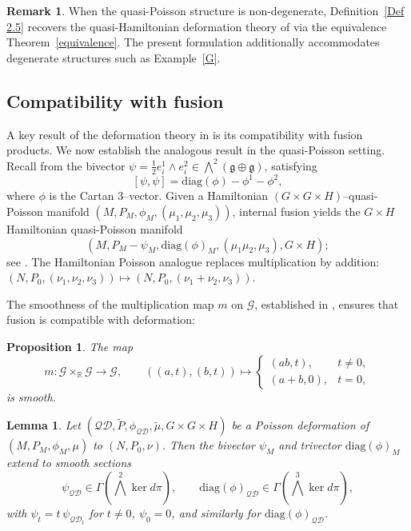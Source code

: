 \documentclass[reqno]{amsart}
\theoremstyle{plain}
\newtheorem{Prop}[Thm]{Proposition}
\newtheorem{Lem}[Thm]{Lemma}
\theoremstyle{definition}
\newtheorem{Rem}[Thm]{Remark}
\begin{document}
\begin{Rem}
When the quasi-Poisson structure is non-degenerate, Definition~\ref{Def 2.5} recovers the quasi-Hamiltonian deformation theory of \cite{JMM2025deformations} via the equivalence Theorem~\ref{equivalence}. The present formulation additionally accommodates degenerate structures such as Example~\ref{G}.
\end{Rem}

\subsection{Compatibility with fusion}\label{sec 3}

A key result of the deformation theory in \cite{JMM2025deformations} is its compatibility with fusion products. We now establish the analogous result in the quasi-Poisson setting. Recall from \cite[]{alekseev2002quasi} the bivector $\psi=\tfrac{1}{2}e^{1}_{i}\wedge e^{2}_{i}\in\bigwedge^{2}(\mathfrak{g}\oplus\mathfrak{g})$, satisfying
\[
[\psi,\psi]=\mathrm{diag}(\phi)-\phi^{1}-\phi^{2},
\]
where $\phi$ is the Cartan 3--vector. Given a Hamiltonian $(G\times G\times H)$--quasi-Poisson manifold $(M,P_{M},\phi_{M},(\mu_{1},\mu_{2},\mu_{3}))$, internal fusion yields the $G\times H$ Hamiltonian quasi-Poisson manifold
\[
(M,P_{M}-\psi_{M},\mathrm{diag}(\phi)_{M},(\mu_{1}\mu_{2},\mu_{3}),G\times H);
\]
see \cite[]{alekseev2002quasi}. The Hamiltonian Poisson analogue replaces multiplication by addition: $(N,P_{0},(\nu_{1},\nu_{2},\nu_{3}))\mapsto (N,P_{0},(\nu_{1}+\nu_{2},\nu_{3}))$.

The smoothness of the multiplication map $m$ on $\mathcal{G}$, established in \cite[]{JMM2025deformations}, ensures that fusion is compatible with deformation:

\begin{Prop}\cite[]{JMM2025deformations}\label{prop:mult-smooth}
The map
\[
m:\mathcal{G}\times_{\mathbb{R}}\mathcal{G}\to\mathcal{G},\qquad
((a,t),(b,t))\mapsto
\begin{cases}
(ab,t), & t\neq 0,\\[4pt]
(a+b,0), & t=0,
\end{cases}
\]
is smooth.
\end{Prop}

\begin{Lem}\label{lem 3.2}
Let $(\mathcal{QD},\tilde{P},\phi_{\mathcal{QD}},\tilde{\mu},G\times G\times H)$ be a Poisson deformation of $(M,P_{M},\phi_{M},\mu)$ to $(N,P_{0},\nu)$. Then the bivector $\psi_{M}$ and trivector $\mathrm{diag}(\phi)_{M}$ extend to smooth sections
\[
\psi_{\mathcal{QD}}\in\Gamma\!\left(\bigwedge^{2}\ker d\pi\right),\qquad
\mathrm{diag}(\phi)_{\mathcal{QD}}\in\Gamma\!\left(\bigwedge^{3}\ker d\pi\right),
\]
with $\psi_{t}=t\,\psi_{\mathcal{QD}_{t}}$ for $t\neq 0$, $\psi_{0}=0$, and similarly for $\mathrm{diag}(\phi)_{\mathcal{QD}}$.
\end{Lem}
\end{document}
